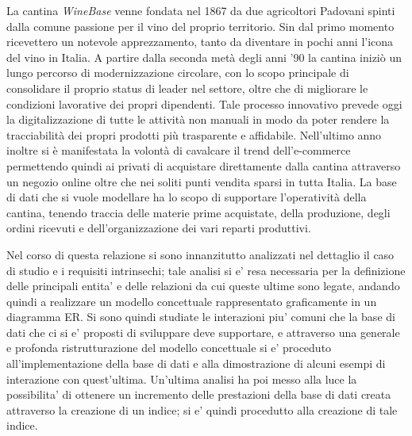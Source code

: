 La cantina \emph{WineBase} venne fondata nel 1867 da due agricoltori Padovani spinti dalla comune passione per il vino del proprio territorio. Sin dal primo momento ricevettero un notevole apprezzamento, tanto da diventare in pochi anni l'icona del vino in Italia. A partire dalla seconda metà degli anni '90 la cantina iniziò un lungo percorso di modernizzazione circolare, con lo scopo principale di consolidare il proprio status di leader nel settore, oltre che di migliorare le condizioni lavorative dei propri dipendenti. Tale processo innovativo prevede oggi la digitalizzazione di tutte le attività non manuali in modo da poter rendere la tracciabilità dei propri prodotti più trasparente e affidabile. Nell'ultimo anno inoltre si è manifestata la volontà di cavalcare il trend dell'e-commerce permettendo quindi ai privati di acquistare direttamente dalla cantina attraverso un negozio online oltre che nei soliti punti vendita sparsi in tutta Italia. La base di dati che si vuole modellare ha lo scopo di supportare l'operatività della cantina, tenendo traccia delle materie prime acquistate, della produzione, degli ordini ricevuti e dell'organizzazione dei vari reparti produttivi. 

Nel corso di questa relazione si sono innanzitutto analizzati nel dettaglio il caso di studio e i requisiti intrinsechi; tale analisi si e' resa necessaria per la definizione delle principali entita' e delle relazioni da cui queste ultime sono legate, andando quindi a realizzare un modello concettuale rappresentato graficamente in un diagramma ER. Si sono quindi studiate le interazioni piu' comuni che la base di dati che ci si e' proposti di sviluppare deve supportare, e attraverso una generale e profonda ristrutturazione del modello concettuale si e' proceduto all'implementazione della base di dati e alla dimostrazione di alcuni esempi di interazione con quest'ultima. Un'ultima analisi ha poi messo alla luce la possibilita' di ottenere un incremento delle prestazioni della base di dati creata attraverso la creazione di un indice; si e' quindi procedutto alla creazione di tale indice.